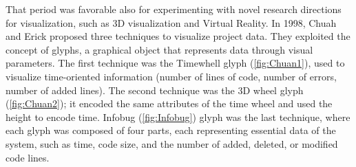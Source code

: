 That period was favorable also for experimenting with novel research directions for visualization, 
such as 3D visualization and Virtual Reality. 
In 1998, Chuah and Erick \cite{Chuah1998} proposed three techniques to visualize project data. 
They exploited the concept of glyphs, a graphical object that represents data through visual parameters. 
The first technique was the Timewhell glyph (\autoref{fig:Chuan1}), used to visualize time-oriented information (number of lines of code, number of errors, number of added lines). 
The second technique was the 3D wheel glyph (\autoref{fig:Chuan2}); it encoded the same attributes of the time wheel and used the height to encode time. 
Infobug (\autoref{fig:Infobug}) glyph was the last technique, where each glyph was composed of four parts, each representing essential data of the system, such as time, code size, and the number of added, deleted, or modified code lines. \newline

